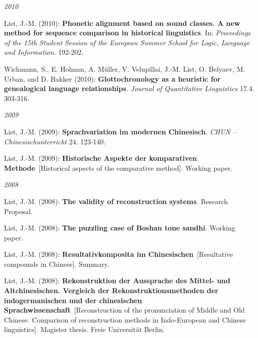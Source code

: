 \par
\noindent\textit{2010}\par\nopagebreak\vspace{0.25cm}
\nopagebreak\noindent List, J.-M. (2010): \textbf{Phonetic alignment based on sound classes}\textbf{. A new method for sequence comparison in historical linguistics}. In: \textit{Proceedings of the 15th Student Session of the European Summer School for Logic, Language and Information}. 192-202.\vspace{0.25cm}
\par
\nopagebreak\noindent Wichmann, S., E. Holman, A. Müller, V. Velupillai, J.-M. List, O. Belyaev, M. Urban, and D. Bakker (2010): \textbf{Glottochronology as a heuristic for genealogical language relationships}. \textit{Journal of Quantitative Linguistics} 17.4. 303-316.\vspace{0.25cm}
\par
\noindent\textit{2009}\par\nopagebreak\vspace{0.25cm}
\nopagebreak\noindent List, J.-M. (2009): \textbf{Sprachvariation im modernen Chinesisch}. \textit{CHUN -- Chinesischunterricht} 24. 123-140.\vspace{0.25cm}
\par
\nopagebreak\noindent List, J.-M. (2009): \textbf{Historische Aspekte der komparativen Methode}\ [Historical aspects of the comparative method]. Working paper.\vspace{0.25cm}
\par
\noindent\textit{2008}\par\nopagebreak\vspace{0.25cm}
\nopagebreak\noindent List, J.-M. (2008): \textbf{The validity of reconstruction systems}. Research Proposal.\vspace{0.25cm}
\par
\nopagebreak\noindent List, J.-M. (2008): \textbf{The puzzling case of Boshan tone sandhi}. Working paper.\vspace{0.25cm}
\par
\nopagebreak\noindent List, J.-M. (2008): \textbf{Resultativkomposita im Chinesischen}\ [Resultative compounds in Chinese]. Summary.\vspace{0.25cm}
\par
\nopagebreak\noindent List, J.-M. (2008): \textbf{Rekonstruktion der Aussprache des Mittel- und Altchinesischen}\textbf{. Vergleich der Rekonstruktionsmethoden der indogermanischen und der chinesischen Sprachwissenschaft}\ [Reconstruction of the pronunciation of Middle and Old Chinese. Comparison of reconstruction methods in Indo-European and Chinese linguistics]. Magister thesis. Freie Universität Berlin.\vspace{0.25cm}
